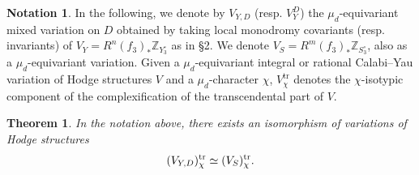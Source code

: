 \documentclass{amsart}
\newtheorem{thm}[theorem]{Theorem}
\theoremstyle{definition}
\newtheorem{notation}[theorem]{Notation}
\theoremstyle{remark}
\def\bZ{\mathbb{Z}}
\numberwithin{equation}{section}
\begin{document}
\begin{notation}\label{notn:subD}
In the following, we denote by $V_{Y,D}$ (resp. $V_Y^D$) the $\mu_d$-equivariant mixed variation on $D$ obtained by taking local monodromy covariants (resp. invariants) of $V_Y=R^{n}(f_3)_*\bZ_{Y^{\circ}_{3}}$ as in \S2.  We denote  $V_S=R^m(f_3)_{*}\bZ_{S^{\circ}_3}$, also as a $\mu_d$-equivariant variation. Given a $\mu_d$-equivariant integral or rational Calabi--Yau variation of Hodge structures $V$ and a $\mu_d$-character $\chi$, $V^{\mathrm{tr}}_{\chi}$ denotes the $\chi$-isotypic component of the complexification of the transcendental part of $V$. 
\end{notation}


\begin{thm}\label{thm:0.19}
In the notation above, there exists an isomorphism of variations of Hodge structures
\[
(V_{Y, D})^{\rm tr}_{\chi} \simeq (V_S)^{\rm tr}_{\chi}.
\]
\end{thm}
\end{document}
